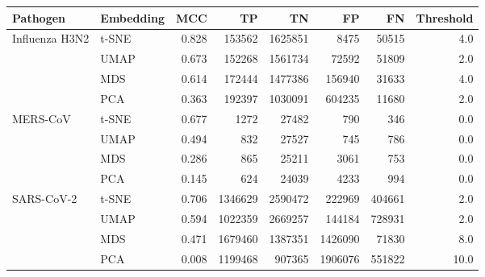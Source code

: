 \begin{tabular}{llrrrrrr}
\toprule
      Pathogen & Embedding &   MCC &      TP &      TN &      FP &     FN &  Threshold \\
\midrule
Influenza H3N2 &     t-SNE & 0.828 &  153562 & 1625851 &    8475 &  50515 &        4.0 \\
               &      UMAP & 0.673 &  152268 & 1561734 &   72592 &  51809 &        2.0 \\
               &       MDS & 0.614 &  172444 & 1477386 &  156940 &  31633 &        4.0 \\
               &       PCA & 0.363 &  192397 & 1030091 &  604235 &  11680 &        2.0 \\
      MERS-CoV &     t-SNE & 0.677 &    1272 &   27482 &     790 &    346 &        0.0 \\
               &      UMAP & 0.494 &     832 &   27527 &     745 &    786 &        0.0 \\
               &       MDS & 0.286 &     865 &   25211 &    3061 &    753 &        0.0 \\
               &       PCA & 0.145 &     624 &   24039 &    4233 &    994 &        0.0 \\
    SARS-CoV-2 &     t-SNE & 0.706 & 1346629 & 2590472 &  222969 & 404661 &        2.0 \\
               &      UMAP & 0.594 & 1022359 & 2669257 &  144184 & 728931 &        2.0 \\
               &       MDS & 0.471 & 1679460 & 1387351 & 1426090 &  71830 &        8.0 \\
               &       PCA & 0.008 & 1199468 &  907365 & 1906076 & 551822 &       10.0 \\
\bottomrule
\end{tabular}
